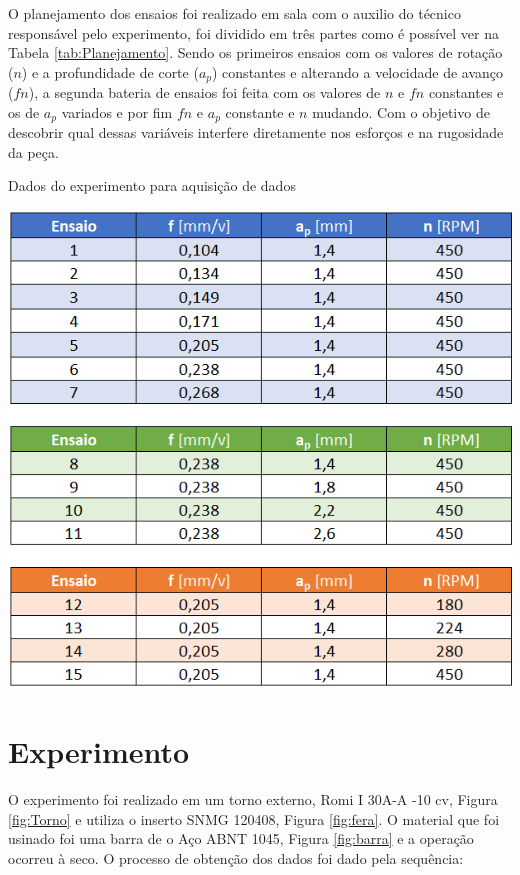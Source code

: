 \documentclass[deposito, acronym, symbols]{fei}
\begin{document}
O planejamento dos ensaios foi realizado em sala com o auxilio do técnico responsável pelo experimento, foi dividido em três partes como é possível ver na Tabela \ref{tab:Planejamento}. Sendo os primeiros ensaios com os valores de rotação ($n$) e a profundidade de corte ($a_p$) constantes e alterando a velocidade de avanço ($fn$), a segunda bateria de ensaios foi feita com os valores de $n$ e $fn$ constantes e os de $a_p$ variados e por fim $fn$ e $a_p$ constante e $n$ mudando. Com o objetivo de descobrir qual dessas variáveis interfere diretamente nos esforços e na rugosidade da peça.

\begin{table}[!htb]
 \centering
    \caption{Dados do experimento para aquisição de dados }
    \includegraphics[width=0.85\linewidth]{Imagens/Exp01_planejamento.png}
    \label{tab:Planejamento}
 \end{table}

\section{Experimento}

O experimento foi realizado em um torno externo, Romi I 30A-A -10 cv, Figura \ref{fig:Torno} e utiliza o inserto SNMG 120408, Figura \ref{fig:fera}. O material que foi usinado foi uma barra de o Aço ABNT 1045, Figura \ref{fig:barra}  e a operação ocorreu à seco. O processo de obtenção dos dados foi dado pela sequência:
\end{document}
